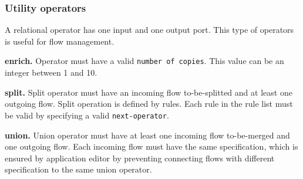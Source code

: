 \subsubsection{Utility operators}
A relational operator has one input and one output port. This type of operators is useful for 
flow management.

\textbf{enrich.}
Operator must have a valid \texttt{number of copies}. This value can be an integer between 
1 and 10.

\textbf{split.}
Split operator must have an incoming flow to-be-splitted and at least one outgoing flow. 
Split operation is defined by rules. Each rule in the rule list must be valid by specifying 
a valid \texttt{next-operator}.

\textbf{union.}
Union operator must have at least one incoming flow to-be-merged and one outgoing flow. 
Each incoming flow must have the same specification, which is ensured by application editor 
by preventing connecting flows with different specification to the same union operator.
